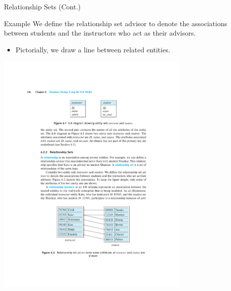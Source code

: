 \documentclass{beamer}
\begin{document}
\begin{frame}{Relationship Sets (Cont.)}
    \begin{exampleblock}{Example}
        We define the relationship set advisor to denote the associations between students and the instructors who act as their advisors.
    \end{exampleblock}
    \begin{itemize}
        \item Pictorially, we draw a line between related entities.
    \end{itemize}
    \centering
    \includegraphics[trim={6.50cm 5cm 6.00cm 17.50cm}, clip, width=0.7\textwidth]{figures/p246}
\end{frame}
\end{document}
